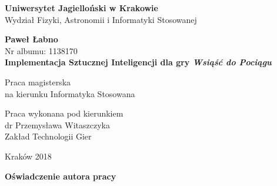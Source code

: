 \documentclass[12pt, oneside]{report}
\begin{document}
  
\setcounter{tocdepth}{1} %
\thispagestyle{empty}
\begin{titlepage}
    \begin{center}

           \Large
	\textbf{Uniwersytet Jagielloński w Krakowie}\vspace{0.2cm}\\ Wydział Fizyki, Astronomii i Informatyki Stosowanej
               \vspace*{1cm}
               
         \vspace{3cm}
         \Large
          \textbf{Paweł Łabno}\\\vspace{0.5cm}
         \normalsize Nr albumu: 1138170\\
             \vspace{2cm}
        \Huge
        \textbf{Implementacja Sztucznej Inteligencji dla gry \textit{Wsiąść do Pociągu}}
      
        \vspace{1.5cm}
        \normalsize
        Praca magisterska\\
        na kierunku Informatyka Stosowana\\ \vspace{0.15cm}
        
        \vfill
        \vspace{2cm}
       \begin{minipage}{1\textwidth}
\begin{flushright}
Praca wykonana pod kierunkiem\\
dr Przemysława Witaszczyka\\
Zakład Technologii Gier
\end{flushright}
\end{minipage}
        
        \vspace{2cm}
        \begin{center}
      Kraków 2018
        \end{center}
    \end{center}
\end{titlepage}

\newpage 
 \thispagestyle{empty}
\vspace{2.5cm}
\begin{flushleft}
\large \textbf{Oświadczenie autora pracy}\vspace{0.6cm}\\
\end{flushleft}
\end{document}
